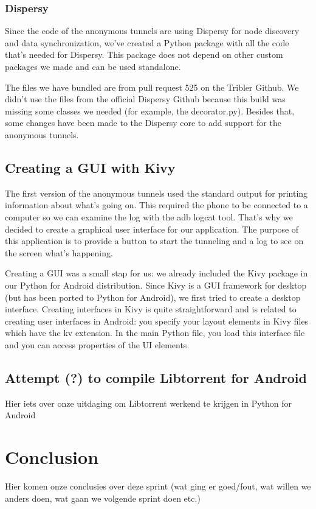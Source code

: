 \documentclass{article}
\begin{document}
\subsubsection{Dispersy}
Since the code of the anonymous tunnels are using Dispersy for node discovery and data synchronization, we’ve created a Python package with all the code that’s needed for Dispersy. This package does not depend on other custom packages we made and can be used standalone.

The files we have bundled are from pull request 525 on the Tribler Github. We didn’t use the files from the official Dispersy Github because this build was missing some classes we needed (for example, the decorator.py). Besides that, some changes have been made to the Dispersy core to add support for the anonymous tunnels.

\subsection{Creating a GUI with Kivy}
The first version of the anonymous tunnels used the standard output for printing information about what’s going on. This required the phone to be connected to a computer so we can examine the log with the adb logcat tool. That’s why we decided to create a graphical user interface for our application. The purpose of this application is to provide a button to start the tunneling and a log to see on the screen what’s happening.

Creating a GUI was a small stap for us: we already included the Kivy package in our Python for Android distribution. Since Kivy is a GUI framework for desktop (but has been ported to Python for Android), we first tried to create a desktop interface. Creating interfaces in Kivy is quite straightforward and is related to creating user interfaces in Android: you specify your layout elements in Kivy files which have the kv extension. In the main Python file, you load this interface file and you can access properties of the UI elements.

\subsection{Attempt (?) to compile Libtorrent for Android}
Hier iets over onze uitdaging om Libtorrent werkend te krijgen in Python for Android

\section{Conclusion}
Hier komen onze conclusies over deze sprint (wat ging er goed/fout, wat willen we anders doen, wat gaan we volgende sprint doen etc.)
\end{document}

